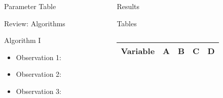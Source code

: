 \begin{frame}[t]
\begin{columns}[t]
\begin{column}{\onecolwid}
\begin{alertblock}{Parameter Table}
\end{alertblock}
\begin{alertblock}{Review: Algorithms}
\begin{algorithm}[H]
	\begin{algorithmic}[1]
	\end{algorithmic}
\caption{Algorithm I}
\label{Algorithm_1}
\end{algorithm}
\begin{itemize}
	\item Observation 1: \\
	\item Observation 2:  \\
	\item Observation 3:  \\
\end{itemize}	
\end{alertblock}
\end{column}
\begin{column}{\onecolwid} %
\begin{alertblock}{Results}
\end{alertblock}
\begin{alertblock}{Tables}

\vspace{4pt}
\centering
\begin{table}[h]\footnotesize
	\caption{}
	\begin{tabular}{rllp{2cm}l}
		\hline	
		Variable & A & B & C & D \\
		\hline 
	\end{tabular}	
\end{table}


\end{alertblock}
\end{column}
\end{columns}
\end{frame}
